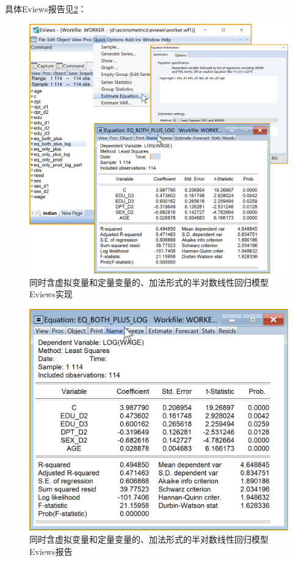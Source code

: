 \documentclass[12pt,(landscape,a4paper),(portrait,a4paper)]{article}
\theoremstyle{definition}
\theoremstyle{definition}
\theoremstyle{definition}
\theoremstyle{remark}
\begin{document}
具体Eviews报告见\ref{fig:both-plus-log-report}：

\begin{figure}

{\centering \includegraphics[width=27.26in]{picture/lab8-dummy-model/3-both-plus-log} 

}

\caption{同时含虚拟变量和定量变量的、加法形式的半对数线性回归模型Eviews实现}\label{fig:both-plus-log}
\end{figure}

\begin{figure}

{\centering \includegraphics[width=18.53in]{picture/lab8-dummy-model/3-both-plus-log-report} 

}

\caption{同时含虚拟变量和定量变量的、加法形式的半对数线性回归模型Eviews报告}\label{fig:both-plus-log-report}
\end{figure}
\end{document}

